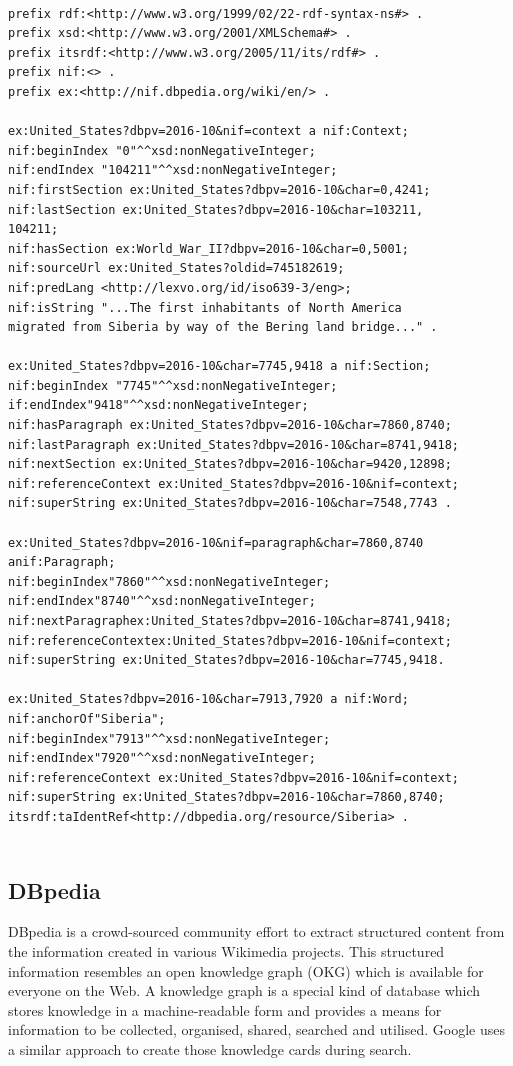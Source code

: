 \documentclass[thesis=M,english]{FITthesis}[2018/05/30]
\begin{document}
\begin{lstlisting}[basicstyle=\small,caption={{Example of NIF taken from \protect\footnotemark \label{NIF Example}}},captionpos=b]

prefix rdf:<http://www.w3.org/1999/02/22-rdf-syntax-ns#> .
prefix xsd:<http://www.w3.org/2001/XMLSchema#> .
prefix itsrdf:<http://www.w3.org/2005/11/its/rdf#> .
prefix nif:<> .
prefix ex:<http://nif.dbpedia.org/wiki/en/> .

ex:United_States?dbpv=2016-10&nif=context a nif:Context;
nif:beginIndex "0"^^xsd:nonNegativeInteger;
nif:endIndex "104211"^^xsd:nonNegativeInteger;
nif:firstSection ex:United_States?dbpv=2016-10&char=0,4241;
nif:lastSection ex:United_States?dbpv=2016-10&char=103211,
104211;
nif:hasSection ex:World_War_II?dbpv=2016-10&char=0,5001;
nif:sourceUrl ex:United_States?oldid=745182619;
nif:predLang <http://lexvo.org/id/iso639-3/eng>;
nif:isString "...The first inhabitants of North America 
migrated from Siberia by way of the Bering land bridge..." .

ex:United_States?dbpv=2016-10&char=7745,9418 a nif:Section;
nif:beginIndex "7745"^^xsd:nonNegativeInteger;
if:endIndex"9418"^^xsd:nonNegativeInteger;
nif:hasParagraph ex:United_States?dbpv=2016-10&char=7860,8740;
nif:lastParagraph ex:United_States?dbpv=2016-10&char=8741,9418;
nif:nextSection ex:United_States?dbpv=2016-10&char=9420,12898;
nif:referenceContext ex:United_States?dbpv=2016-10&nif=context;
nif:superString ex:United_States?dbpv=2016-10&char=7548,7743 .

ex:United_States?dbpv=2016-10&nif=paragraph&char=7860,8740
anif:Paragraph;
nif:beginIndex"7860"^^xsd:nonNegativeInteger;
nif:endIndex"8740"^^xsd:nonNegativeInteger;
nif:nextParagraphex:United_States?dbpv=2016-10&char=8741,9418;
nif:referenceContextex:United_States?dbpv=2016-10&nif=context;
nif:superString ex:United_States?dbpv=2016-10&char=7745,9418.

ex:United_States?dbpv=2016-10&char=7913,7920 a nif:Word;
nif:anchorOf"Siberia";
nif:beginIndex"7913"^^xsd:nonNegativeInteger;
nif:endIndex"7920"^^xsd:nonNegativeInteger;
nif:referenceContext ex:United_States?dbpv=2016-10&nif=context;
nif:superString ex:United_States?dbpv=2016-10&char=7860,8740;
itsrdf:taIdentRef<http://dbpedia.org/resource/Siberia> .
	
\end{lstlisting}
\subsection{DBpedia}
DBpedia \cite{dbpedia:core} is a crowd-sourced community effort to extract structured content from the information created in various Wikimedia projects. This structured information resembles an open knowledge graph (OKG) which is available for everyone on the Web. A knowledge graph is a special kind of database which stores knowledge in a machine-readable form and provides a means for information to be collected, organised, shared, searched and utilised. Google uses a similar approach to create those knowledge cards during search.
\end{document}
